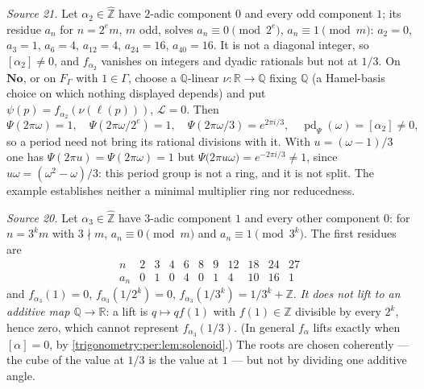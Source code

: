 \documentclass[11pt,letterpaper]{article}
\numberwithin{equation}{section}
\theoremstyle{definition}
\theoremstyle{remark}
\newcommand{\No}{\mathbf{No}}
\newcommand{\R}{\mathbb R}
\newcommand{\Q}{\mathbb Q}
\newcommand{\Z}{\mathbb Z}
\newcommand{\pd}{\operatorname{pd}}
\newcommand{\Zhat}{\widehat{\Z}}
\newcommand{\cL}{\mathcal L}
\begin{document}
\begin{example}\label{trigonometry:per:ex:profinite}
\emph{Source 21.} Let $\alpha_2\in\Zhat$ have $2$-adic component $0$ and every odd component $1$; its
residue $a_n$ for $n=2^em$, $m$ odd, solves $a_n\equiv0\pmod{2^e}$, $a_n\equiv1\pmod m$:
$a_2=0$, $a_3=1$, $a_6=4$, $a_{12}=4$, $a_{24}=16$, $a_{40}=16$. It is not a diagonal integer, so
$[\alpha_2]\ne0$, and $f_{\alpha_2}$ vanishes on integers and dyadic rationals but not at $1/3$. On $\No$,
or on $F_\Gamma$ with $1\in\Gamma$, choose a $\Q$-linear $\nu:\R\to\Q$ fixing $\Q$ (a Hamel-basis choice
on which nothing displayed depends) and put $\psi(p)=f_{\alpha_2}(\nu(\ell(p)))$, $\cL=0$. Then
\[
 \Psi(2\pi\omega)=1,\quad \Psi(2\pi\omega/2^e)=1,\quad \Psi(2\pi\omega/3)=e^{2\pi i/3},\quad
 \pd_\Psi(\omega)=[\alpha_2]\ne0 ,
\]
so a period need not bring its rational divisions with it. With $u=(\omega-1)/3$ one has
$\Psi(2\pi u)=\Psi(2\pi\omega)=1$ but $\Psi\bigl(2\pi u\omega\bigr)=e^{-2\pi i/3}\ne1$, since
$u\omega=(\omega^2-\omega)/3$: this period group is not a ring, and it is not split. The example
establishes neither a minimal multiplier ring nor reducedness.

\emph{Source 20.} Let $\alpha_3\in\Zhat$ have $3$-adic component $1$ and every other component $0$:
for $n=3^km$ with $3\nmid m$, $a_n\equiv0\pmod m$ and $a_n\equiv1\pmod{3^k}$. The first residues are
\[
\begin{array}{c|rrrrrrrrrr}
 n&2&3&4&6&8&9&12&18&24&27\\\hline
 a_n&0&1&0&4&0&1&4&10&16&1
\end{array}
\]
and $f_{\alpha_3}(1)=0$, $f_{\alpha_3}(1/2^k)=0$, $f_{\alpha_3}(1/3^k)=1/3^k+\Z$. \emph{It does not lift
to an additive map $\Q\to\R$}: a lift is $q\mapsto qf(1)$ with $f(1)\in\Z$ divisible by every $2^k$,
hence zero, which cannot represent $f_{\alpha_3}(1/3)$. (In general $f_\alpha$ lifts exactly when
$[\alpha]=0$, by \cref{trigonometry:per:lem:solenoid}.) The roots are chosen coherently --- the cube
of the value at $1/3$ is the value at $1$ --- but not by dividing one additive angle.
\end{example}
\end{document}

